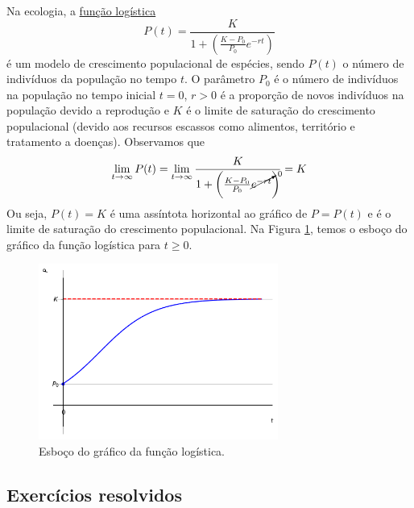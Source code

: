 \cleardoublepage\documentclass[../main.tex]{subfiles}
\begin{document}
\begin{ex}
  Na ecologia, a \href{https://pt.wikipedia.org/wiki/Fun\%C3\%A7\%C3\%A3o_log\%C3\%ADstica}{função logística}
    \begin{equation*}
      P(t) = \frac{K}{1 + \left(\frac{K-P_0}{P_0}e^{-rt}\right)}
    \end{equation*}
    é um modelo de crescimento populacional de espécies, sendo $P(t)$ o número de indivíduos da população no tempo $t$. O parâmetro $P_0$ é o número de indivíduos na população no tempo inicial $t=0$, $r>0$ é a proporção de novos indivíduos na população devido a reprodução e $K$ é o limite de saturação do crescimento populacional (devido aos recursos escassos como alimentos, território e tratamento a doenças). Observamos que
    \renewcommand{\CancelColor}{\color{red}}%
    \begin{equation*}
      \lim_{t\to\infty} P(t) = \lim_{t\to\infty} \frac{K}{1 + \left(\frac{K-P_0}{P_0}\cancelto{0}{e^{-rt}}\right)} = K
    \end{equation*}
    Ou seja, $P(t) = K$ é uma assíntota horizontal ao gráfico de $P = P(t)$ e é o limite de saturação do crescimento populacional. Na Figura \ref{fig:liminf_ex_funlogic}, temos o esboço do gráfico da função logística para $t\geq 0$.

    \begin{figure}[H]
      \centering
      \includegraphics[width=0.7\textwidth]{fig_lim/fig_liminf_ex_funlogic}
      \caption{Esboço do gráfico da função logística.}
      \label{fig:liminf_ex_funlogic}
    \end{figure}
\end{ex}

\subsection{Exercícios resolvidos}
\end{document}
